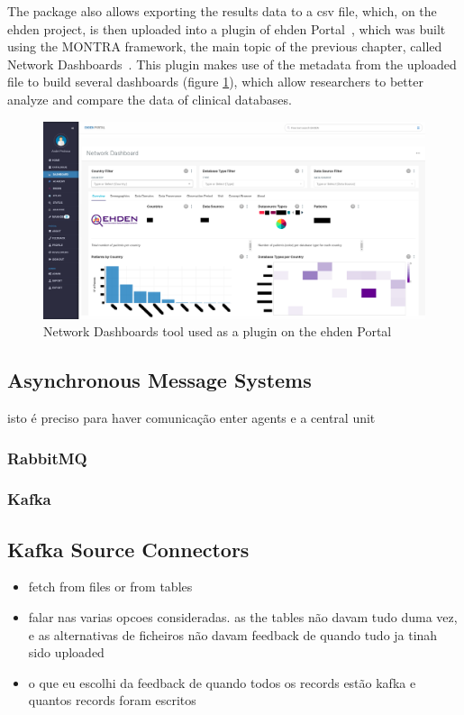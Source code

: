 The package also allows exporting the results data to a \gls{csv} file, which, on the \gls{ehden} project, is then uploaded into a plugin of \gls{ehden} Portal~\cite{ehden-portal}, which was built using the MONTRA framework, the main topic of the previous chapter, called Network Dashboards~\cite{dashboards}.
This plugin makes use of the metadata from the uploaded file to build several dashboards (figure \ref{fig:dashboards}), which allow researchers to better analyze and compare the data of clinical databases.

\begin{figure}
    \center
    \includegraphics[width=\textwidth]{dashboards}
    \caption{Network Dashboards tool used as a plugin on the \gls{ehden} Portal}
    \label{fig:dashboards}
\end{figure}

\subsection{Asynchronous Message Systems}

isto é preciso para haver comunicação enter agents e a central unit

\subsubsection{RabbitMQ}

\subsubsection{Kafka}


\subsection{Kafka Source Connectors}
\begin{itemize}
    \item fetch from files or from tables
    \item falar nas varias opcoes consideradas. as the tables não davam tudo duma vez, e as alternativas de ficheiros não davam feedback de quando tudo ja tinah sido uploaded
    \item o que eu escolhi da feedback de quando todos os records estão kafka e quantos records foram escritos
\end{itemize}

